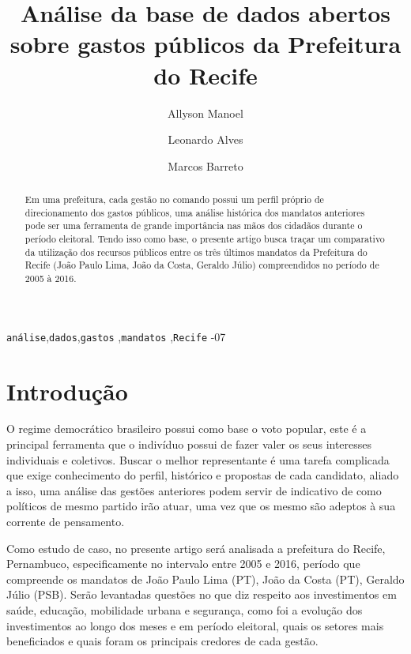 \documentclass[authoryear]{elsarticle}
\begin{document}
\begin{frontmatter}

\title{An\'alise da base de dados abertos sobre gastos p\'ublicos da Prefeitura do Recife}


\author{Allyson Manoel}
\author{Leonardo Alves}
\author{Marcos Barreto}

\begin{abstract}
Em uma prefeitura, cada gestão no comando possui um perfil próprio de direcionamento dos gastos públicos, uma análise histórica dos mandatos anteriores pode ser uma ferramenta de grande importância nas mãos dos cidadãos durante o período eleitoral. Tendo isso como base, o presente artigo busca traçar um comparativo da utilização dos recursos públicos entre os três últimos mandatos da Prefeitura do Recife (João Paulo Lima, João da Costa, Geraldo Júlio) compreendidos no período de 2005 à 2016.  
\end{abstract}

\begin{keyword}
\texttt{análise}\sep \texttt{dados}\sep \texttt{gastos} \sep \texttt{mandatos} \sep \texttt{Recife}
-07
\end{keyword}

\end{frontmatter}

\linenumbers

\section{Introdução}

O regime democrático brasileiro possui como base o voto popular, este é a principal ferramenta que o indivíduo possui de fazer valer os seus interesses individuais e coletivos. Buscar o melhor representante é uma tarefa complicada que exige conhecimento do perfil, histórico e propostas de cada candidato, aliado a isso, uma análise das gestões anteriores podem servir de indicativo de como políticos de mesmo partido irão atuar, uma vez que os mesmo são adeptos à sua corrente de pensamento\citep{adriana2013}. 

Como estudo de caso, no presente artigo será analisada a prefeitura do Recife, Pernambuco, especificamente no intervalo entre 2005 e 2016, período que compreende os mandatos de João Paulo Lima (PT), João da Costa (PT), Geraldo Júlio (PSB). Serão levantadas questões no que diz respeito aos investimentos em saúde, educação, mobilidade urbana e segurança, como foi a evolução dos investimentos ao longo dos meses e em período eleitoral, quais os setores mais beneficiados e quais foram os principais credores de cada gestão. 
\end{document}
